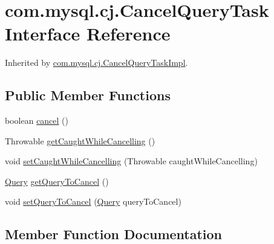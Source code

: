 \hypertarget{interfacecom_1_1mysql_1_1cj_1_1_cancel_query_task}{}\section{com.\+mysql.\+cj.\+Cancel\+Query\+Task Interface Reference}
\label{interfacecom_1_1mysql_1_1cj_1_1_cancel_query_task}


Inherited by \mbox{\hyperlink{classcom_1_1mysql_1_1cj_1_1_cancel_query_task_impl}{com.\+mysql.\+cj.\+Cancel\+Query\+Task\+Impl}}.

\subsection*{Public Member Functions}
\begin{DoxyCompactItemize}
\item 
boolean \mbox{\hyperlink{interfacecom_1_1mysql_1_1cj_1_1_cancel_query_task_a03c962300939f773da40e8e6b451fb8c}{cancel}} ()
\item 
Throwable \mbox{\hyperlink{interfacecom_1_1mysql_1_1cj_1_1_cancel_query_task_a034f915ab5a54b244d44e462421d7036}{get\+Caught\+While\+Cancelling}} ()
\item 
void \mbox{\hyperlink{interfacecom_1_1mysql_1_1cj_1_1_cancel_query_task_aacd2c076a44dd83a7d4140278ae9d0b9}{set\+Caught\+While\+Cancelling}} (Throwable caught\+While\+Cancelling)
\item 
\mbox{\hyperlink{interfacecom_1_1mysql_1_1cj_1_1_query}{Query}} \mbox{\hyperlink{interfacecom_1_1mysql_1_1cj_1_1_cancel_query_task_a676c3131b684b869e322954254116b87}{get\+Query\+To\+Cancel}} ()
\item 
void \mbox{\hyperlink{interfacecom_1_1mysql_1_1cj_1_1_cancel_query_task_ab9f6e0f8efcfd3f4b275bb1eb927b933}{set\+Query\+To\+Cancel}} (\mbox{\hyperlink{interfacecom_1_1mysql_1_1cj_1_1_query}{Query}} query\+To\+Cancel)
\end{DoxyCompactItemize}


\subsection{Member Function Documentation}
\mbox{\label{interfacecom_1_1mysql_1_1cj_1_1_cancel_query_task_a03c962300939f773da40e8e6b451fb8c}} 
